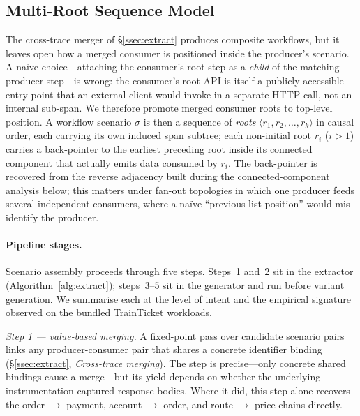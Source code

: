 \documentclass[conference]{IEEEtran}
\begin{document}
\subsection{Multi-Root Sequence Model}
\label{ssec:multiroot}

The cross-trace merger of \S\ref{ssec:extract} produces composite workflows, but it leaves open how a merged consumer is positioned inside the producer's scenario. A na\"ive choice---attaching the consumer's root step as a \emph{child} of the matching producer step---is wrong: the consumer's root API is itself a publicly accessible entry point that an external client would invoke in a separate HTTP call, not an internal sub-span. We therefore promote merged consumer roots to top-level position. A workflow scenario $\sigma$ is then a sequence of \emph{roots} $\langle r_1, r_2, \ldots, r_k\rangle$ in causal order, each carrying its own induced span subtree; each non-initial root $r_i$ ($i > 1$) carries a back-pointer to the earliest preceding root inside its connected component that actually emits data consumed by $r_i$. The back-pointer is recovered from the reverse adjacency built during the connected-component analysis below; this matters under fan-out topologies in which one producer feeds several independent consumers, where a na\"ive ``previous list position'' would mis-identify the producer.

\paragraph{Pipeline stages.}
Scenario assembly proceeds through five steps. Steps~1 and~2 sit in the extractor (Algorithm~\ref{alg:extract}); steps~3--5 sit in the generator and run before variant generation. We summarise each at the level of intent and the empirical signature observed on the bundled TrainTicket workloads.

\emph{Step 1 --- value-based merging.}
A fixed-point pass over candidate scenario pairs links any producer-consumer pair that shares a concrete identifier binding (\S\ref{ssec:extract}, \emph{Cross-trace merging}). The step is precise---only concrete shared bindings cause a merge---but its yield depends on whether the underlying instrumentation captured response bodies. Where it did, this step alone recovers the order $\to$ payment, account $\to$ order, and route $\to$ price chains directly.
\end{document}
